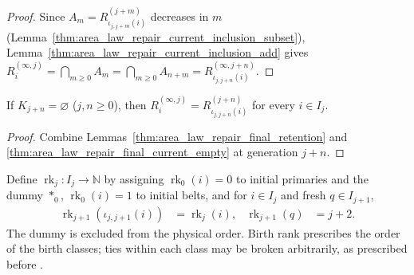 \begin{proof}\leanok
    Since $A_m=R_{\iota_{j,j+m}(i)}^{(j+m)}$ decreases in $m$
    (Lemma~\ref{thm:area_law_repair_current_inclusion_subset}), Lemma~\ref{thm:area_law_repair_current_inclusion_add}
    gives $R_i^{(\infty,j)}=\bigcap_{m\ge0}A_m=\bigcap_{m\ge0}A_{n+m}=R_{\iota_{j,j+n}(i)}^{(\infty,j+n)}$.
\end{proof}

\begin{lemma}
    \label{thm:area_law_repair_final_current_later_empty}
    \leanok
    If $K_{j+n}=\varnothing$ ($j,n\ge0$), then
    $R_i^{(\infty,j)}=R_{\iota_{j,j+n}(i)}^{(j+n)}$ for every $i\in I_j$.
\end{lemma}

\begin{proof}\leanok
    Combine Lemmas~\ref{thm:area_law_repair_final_retention} and
    \ref{thm:area_law_repair_final_current_empty} at generation $j+n$.
\end{proof}

\begin{definition}
    \label{def:area_law_repair_birth_rank}
    \leanok
    Define $\operatorname{rk}_j:I_j\to\mathbb N$ by assigning $\operatorname{rk}_0(i)=0$ to
    initial primaries and the dummy $*_0$, $\operatorname{rk}_0(i)=1$ to initial belts, and for
    $i\in I_j$ and fresh $q\in I_{j+1}$,
    \begin{align}
        \operatorname{rk}_{j+1}(\iota_{j,j+1}(i))
         & =\operatorname{rk}_j(i),
         & \operatorname{rk}_{j+1}(q) & =j+2.
        \label{eq:area_law_repair_birth_rank}
    \end{align}
    The dummy is excluded from the physical order. Birth rank prescribes
    the order of the birth classes; ties within each class may be broken
    arbitrarily, as prescribed before
    \cite[Lemma~11.5]{OpenAI2026AreaLaw}.
\end{definition}

